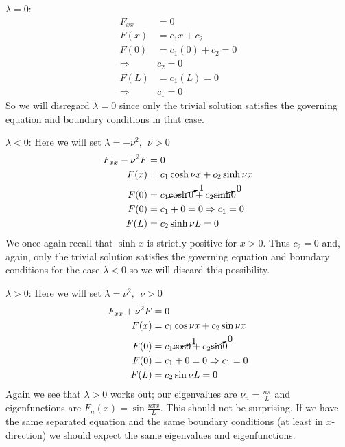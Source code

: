 \noindent\underline{$\lambda = 0$}:
\begin{align*}
F_{xx} &= 0 \\
F(x) &= c_1x + c_2 \\
F(0) &= c_1(0) + c_2 = 0 \\
\Rightarrow & c_2 = 0 \\
F(L) &= c_1(L) = 0 \\
\Rightarrow & c_1 = 0
\end{align*}
So we will disregard $\lambda = 0$ since only the trivial solution satisfies the governing equation and boundary conditions in that case.

\vspace{0.25cm}

\noindent\underline{$\lambda < 0$}:  Here we will set $\lambda = -\nu^2, \ \ \nu>0$ 
\begin{align*}
F_{xx} - \nu^2 F &= 0 \\
F(x) &= c_1 \cosh{\nu x} + c_2 \sinh{\nu x} \\
F(0) &= c_1 \cancelto{1}{\cosh{0}} + c_2 \cancelto{0}\sinh{0} \\
F(0) &= c_1 + 0 = 0 \Rightarrow c_1 = 0 \\
F(L) &= c_2 \sinh{\nu L} = 0 \\
\end{align*}
We once again recall that $\sinh{x}$ is strictly positive for $x>0$.  Thus $c_2 = 0$ and, again, only the trivial solution satisfies the governing equation and boundary conditions for the case $\lambda < 0$ so we will discard this possibility.

\vspace{0.25cm}

\noindent\underline{$\lambda > 0$}:  Here we will set $\lambda = \nu^2, \ \ \nu>0$
\begin{align*}
F_{xx} + \nu^2 F &= 0 \\
F(x) &= c_1 \cos{\nu x} + c_2 \sin{\nu x} \\
F(0) &= c_1 \cancelto{1}\cos{0} + c_2 \cancelto{0}\sin{0} \\
F(0) &= c_1 + 0 = 0 \Rightarrow c_1 = 0 \\
F(L) &= c_2 \sin{\nu L} = 0
\end{align*}
Again we see that $\lambda > 0$ works out; our eigenvalues are $\nu_n = \frac{n \pi}{L}$ and eigenfunctions are $F_n(x) = \sin{\frac{n \pi x}{L}}$.  This should not be surprising.  If we have the same separated equation and the same boundary conditions (at least in $x$-direction) we should expect the same eigenvalues and eigenfunctions.


